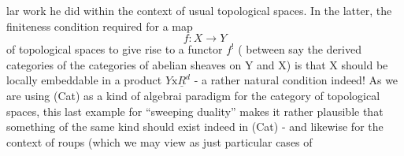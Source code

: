 lar work he did within the context of usual topological spaces.  In the
latter,  the finiteness condition required for a map 
\[ f: X \longrightarrow Y \]
of topological spaces to give rise to a functor  $f^{!}$  ( between\hand{,} say\hand{,}
the derived categories of the categories of abelian sheaves on Y and X)
is  that X should be locally embeddable in a product  $Y\mathrm{x}\underline{R}^{d}$  -  a rather
natural condition indeed!   As we are using (Cat) as a kind of algebrai
paradigm for the category of topological spaces,  this last example
for ``sweeping duality''  makes it rather plausible  that something
of the same kind should exist indeed in (Cat)  -  and likewise for the
context of roups  (which we may view as just particular cases of

